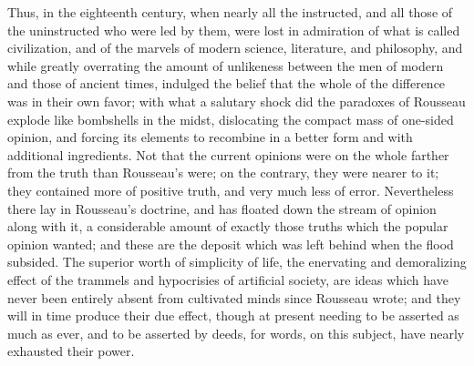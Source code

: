 \documentclass[12pt]{report}
\begin{document}
Thus, in the eighteenth century, when nearly all the instructed, and all those of the uninstructed who were led by them, were lost in admiration of what is called civilization, and of the marvels of modern science, literature, and philosophy, and while greatly overrating the amount of unlikeness between the men of modern and those of ancient times, indulged the belief that the whole of the difference was in their own favor; with what a salutary shock did the paradoxes of Rousseau explode like bombshells in the midst, dislocating the compact mass of one-sided opinion, and forcing its elements to recombine in a better form and with additional ingredients. Not that the current opinions were on the whole farther from the truth than Rousseau's were; on the contrary, they were nearer to it; they contained more of positive truth, and very much less of error. Nevertheless there lay in Rousseau's doctrine, and has floated down the stream of opinion along with it, a considerable amount of exactly those truths which the popular opinion wanted; and these are the deposit which was left behind when the flood subsided. The superior worth of simplicity of life, the enervating and demoralizing effect of the trammels and hypocrisies of artificial society, are ideas which have never been entirely absent from cultivated minds since Rousseau wrote; and they will in time produce their due effect, though at present needing to be asserted as much as ever, and to be asserted by deeds, for words, on this subject, have nearly exhausted their power.
\end{document}

